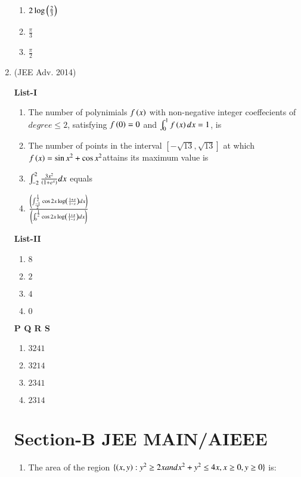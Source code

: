 \documentclass[journal,12pt,twocolumn]{IEEEtran}
\theoremstyle{remark}
\begin{document}
\begin{enumerate}
\begin{multicols}{2}
\begin{enumerate}
					\item $2\log\left(\frac{2}{3}\right)$

					\item $\frac{\pi}{3}$

					\item $\frac{\pi}{2}$
				\end{enumerate}
			\end{multicols}


		\item 
			\hfill{(JEE Adv. 2014)}
			\begin{multicols}{2}
				\textbf{List-I} 
				\begin{enumerate}
					\item The number of polynimials $f\left(x\right)$ with non-negative integer coeffecients of $degree \leq 2$, satisfying $f\left(0\right)=0$ and $\int_{0}^{1}f\left(x\right)dx=1$, is
					\item The number of points in the interval $\left[-\sqrt{13},\sqrt{13}\right]$ at which $f\left(x\right)= \sin x^{2}+\cos x^{2}$attains its maximum value is
					\item $\int_{-2}^{2}\frac{3x^{2}}{\left(1+e^{x}\right)}dx$ equals
					\item $\frac{\left(\int_{\frac{-1}{2}}^{\frac{1}{2}}\cos 2x\log\left(\frac{1+x}{1-x}\right)dx\right)}{\left(\int_{0}^{\frac{1}{2}}\cos 2x\log\left(\frac{1+x}{1-x}\right)dx\right)}$
				\end{enumerate}
				\columnbreak
				\textbf{List-II}
				\begin{enumerate}
					\item $8$

					\item $2$

					\item $4$

					\item $0$
				\end{enumerate}
		\end{multicols}
			\textbf{   P Q R S}
			\begin{enumerate}
		
				\item $3 2 4 1$
				\item $3 2 1 4$
				\item $2 3 4 1$
				\item $2 3 1 4$
			\end{enumerate}
\twocolumn
\section*{\textbf{Section-B} JEE MAIN/AIEEE }
\begin{enumerate}
	\item The area  of the region $\{\left(x,y\right):y^{2}\geq 2x and x^{2}+y^{2}\leq 4x, x\geq0, y\geq0\}$ is:


\end{enumerate}
\end{enumerate}
\end{document}
